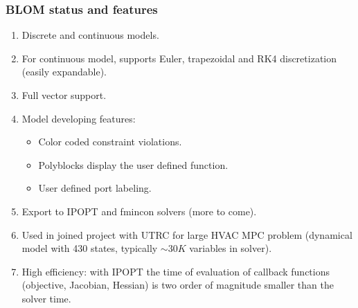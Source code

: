 \documentclass[mathserif]{beamer}
\begin{document}
\begin{frame}
\frametitle{BLOM status and features}
\begin{enumerate}
\item Discrete and continuous models.
\item For continuous model, supports Euler, trapezoidal and RK4 discretization
  (easily expandable).
\item Full vector support.
\item Model developing features: 
\begin{itemize}
\item Color coded constraint violations.
\item Polyblocks display the user defined function.
\item User defined port labeling. 
\end{itemize}
\item Export to IPOPT and fmincon solvers (more to come).
\item Used in joined project with UTRC for large HVAC MPC problem (dynamical
  model with 430 states, typically $\sim30K$ variables in solver). 
\item High efficiency: with IPOPT the time of evaluation of callback functions
  (objective, Jacobian, Hessian) is two order of magnitude smaller than the
  solver time.
\end{enumerate}



\end{frame}
\end{document}
